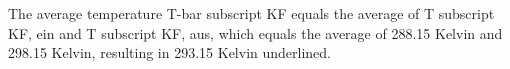 The average temperature T-bar subscript KF equals the average of T subscript KF, ein and T subscript KF, aus, which equals the average of 288.15 Kelvin and 298.15 Kelvin, resulting in 293.15 Kelvin underlined.